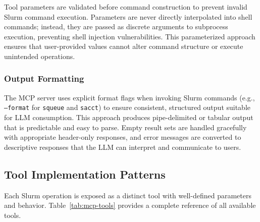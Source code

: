 Tool parameters are validated before command construction to prevent invalid Slurm command execution. Parameters are never directly interpolated into shell commands; instead, they are passed as discrete arguments to subprocess execution, preventing shell injection vulnerabilities. This parameterized approach ensures that user-provided values cannot alter command structure or execute unintended operations.

\subsubsection{Output Formatting}

The MCP server uses explicit format flags when invoking Slurm commands (e.g., \texttt{--format} for \texttt{squeue} and \texttt{sacct}) to ensure consistent, structured output suitable for LLM consumption. This approach produces pipe-delimited or tabular output that is predictable and easy to parse. Empty result sets are handled gracefully with appropriate header-only responses, and error messages are converted to descriptive responses that the LLM can interpret and communicate to users.

\subsection{Tool Implementation Patterns}

Each Slurm operation is exposed as a distinct tool with well-defined parameters and behavior. Table~\ref{tab:mcp-tools} provides a complete reference of all available tools.

